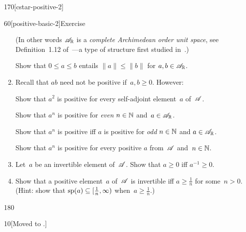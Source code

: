 \begin{parsec}{170}[cstar-positive-2]
\begin{point}{60}[positive-basic-2]{Exercise}
\begin{enumerate}
(In other words
$\sa{\scrA}$ is a \emph{complete Archimedean order unit space},
see Definition~1.12 of~\cite{alfsen2012}---a 
type of structure first studied in~\cite{kadison1951}.)


Show that $0\leq a \leq b$ entails $\|a\|\leq \|b\|$
for $a,b\in\sa{\scrA}$.

\item 
Recall that $ab$ need not be positive if~$a,b\geq 0$. However:

Show that $a^2$ is positive for every self-adjoint element~$a$ of~$\mathscr{A}$.

Show that $a^n$ is positive for \emph{even} $n\in \mathbb{N}$ and~$a\in\mathscr{A}_{\mathbb{R}}$.

Show that $a^n$ is positive iff $a$ is positive for \emph{odd} $n\in \mathbb{N}$
and $a\in\mathscr{A}_{\mathbb{R}}$.

Show that $a^n$ is positive
for every positive $a$ from~$\mathscr{A}$ and~$n\in \mathbb{N}$.
\item
Let~$a$ be an invertible element of~$\mathscr{A}$.
Show that $a\geq 0$ iff $a^{-1}\geq 0$.

\item
Show that a positive element~$a$ of~$\mathscr{A}$ is invertible
iff $a\geq \frac{1}{n}$ for some~$n>0$.
(Hint: show that $\mathrm{sp}(a)\subseteq [\frac{1}{n},\infty)$
		when~$a\geq \frac{1}{n}$.)
\end{enumerate}%
\spacingfix{}%
\end{point}%
\end{parsec}%
\begin{parsec}{180}%
\begin{point}{10}{[Moved to .]}
\end{point}
\end{parsec}
